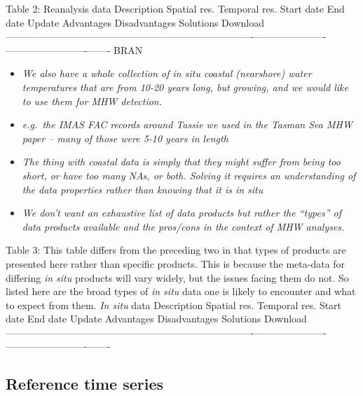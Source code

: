 \documentclass[]{article}
\providecommand{\tightlist}{%
  \setlength{\itemsep}{0pt}\setlength{\parskip}{0pt}}
\begin{document}
Table 2: \textbar{}Reanalysis data \textbar{}Description
\textbar{}Spatial res. \textbar{}Temporal res. \textbar{}Start date
\textbar{}End date \textbar{}Update \textbar{}Advantages
\textbar{}Disadvantages \textbar{}Solutions \textbar{}Download
\textbar{}
\textbar{}------------------\textbar{}------------------------------------------------\textbar{}----------\textbar{}--------\textbar{}--------\textbar{}-------\textbar{}------\textbar{}------\textbar{}------\textbar{}-------\textbar{}-------\textbar{}
\textbar{}BRAN \textbar{}

\begin{itemize}
\tightlist
\item
  \emph{We also have a whole collection of in situ coastal (nearshore)
  water temperatures that are from 10-20 years long, but growing, and we
  would like to use them for MHW detection.}
\item
  \emph{e.g.~the IMAS FAC records around Tassie we used in the Tasman
  Sea MHW paper -- many of those were 5-10 years in length}
\item
  \emph{The thing with coastal data is simply that they might suffer
  from being too short, or have too many NAs, or both. Solving it
  requires an understanding of the data properties rather than knowing
  that it is in situ}
\item
  \emph{We don't want an exhaustive list of data products but rather the
  ``types'' of data products available and the pros/cons in the context
  of MHW analyses.}
\end{itemize}

Table 3: This table differs from the preceding two in that types of
products are presented here rather than specific products. This is
because the meta-data for differing \emph{in situ} products will vary
widely, but the issues facing them do not. So listed here are the broad
types of \emph{in situ} data one is likely to encounter and what to
expect from them. \textbar{} \emph{In situ} data \textbar{}Description
\textbar{}Spatial res. \textbar{}Temporal res. \textbar{}Start date
\textbar{}End date \textbar{}Update \textbar{}Advantages
\textbar{}Disadvantages \textbar{}Solutions \textbar{}Download
\textbar{}
\textbar{}------------------\textbar{}------------------------------------------------\textbar{}----------\textbar{}--------\textbar{}--------\textbar{}-------\textbar{}------\textbar{}------\textbar{}------\textbar{}-------\textbar{}-------\textbar{}

\subsection{Reference time series}\label{reference-time-series}
\end{document}
